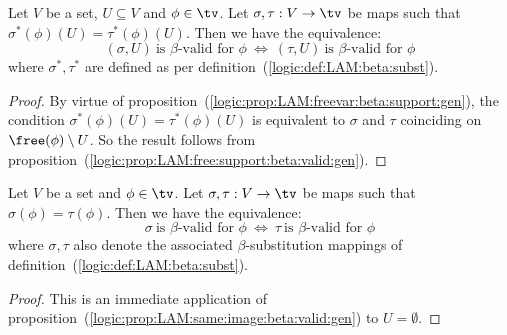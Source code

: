 \begin{prop}\label{logic:prop:LAM:same:image:beta:valid:gen}
    Let $V$ be a set, $U\subseteq V$ and $\phi\in\tv$. Let $\sigma,\tau:V\to\tv$ 
    be maps such that $\sigma^{*}(\phi)(U)=\tau^{*}(\phi)(U)$. Then we have the 
    equivalence:
        \[
            (\sigma,U)\ \mbox{is $\beta$-valid for $\phi$}\ 
            \Leftrightarrow\
            (\tau,U)\ \mbox{is $\beta$-valid for $\phi$}
        \]
    where $\sigma^{*}, \tau^{*}$ are defined as per 
    definition~(\ref{logic:def:LAM:beta:subst}).
\end{prop}
\begin{proof}
    By virtue of proposition~(\ref{logic:prop:LAM:freevar:beta:support:gen}),
    the condition $\sigma^{*}(\phi)(U)=\tau^{*}(\phi)(U)$ is equivalent
    to $\sigma$ and $\tau$ coinciding on $\free(\phi)\setminus U$. So the
    result follows from
    proposition~(\ref{logic:prop:LAM:free:support:beta:valid:gen}).
\end{proof}

\begin{prop}\label{logic:prop:LAM:same:image:beta:valid}
    Let $V$ be a set and $\phi\in\tv$. Let $\sigma,\tau:V\to\tv$ be maps such 
    that $\sigma(\phi)=\tau(\phi)$. Then we have the equivalence:
        \[
            \sigma\ \mbox{is $\beta$-valid for $\phi$}\ 
            \Leftrightarrow\
            \tau\ \mbox{is $\beta$-valid for $\phi$}
        \]
    where $\sigma, \tau$ also denote the associated $\beta$-substitution 
    mappings of definition~(\ref{logic:def:LAM:beta:subst}).
\end{prop}
\begin{proof}
    This is an immediate application of 
    proposition~(\ref{logic:prop:LAM:same:image:beta:valid:gen})
    to $U=\emptyset$.
\end{proof}

